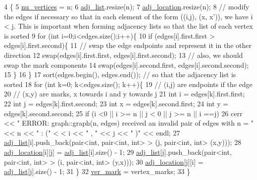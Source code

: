\begin{DoxyCode}
4 \{ 
5   \hyperlink{classmarked__graph_acf79c6aeb8f32614cb14a5baaa6c9f9b}{nu\_vertices} = n;
6   \hyperlink{classmarked__graph_a1a0bf7ca413a278763f7c878b3b6fd6f}{adj\_list}.resize(n);
7   \hyperlink{classmarked__graph_a3ae722ea9583ad23af34d789a88ac01a}{adj\_location}.resize(n);
8   \textcolor{comment}{// modify the edges if necessary so that in each element of the form ((i,j), (x, x')), we have i < j.
       This is important when forming adjacency lists so that the list of each vertex is sorted}
9   \textcolor{keywordflow}{for} (\textcolor{keywordtype}{int} i=0;i<edges.size();i++)\{
10     \textcolor{keywordflow}{if} (edges[i].first.first > edges[i].first.second)\{
11       \textcolor{comment}{// swap the edge endpoints and represent it in the other direction}
12       swap(edges[i].first.first, edges[i].first.second);
13       \textcolor{comment}{// also, we should swap the mark components}
14       swap(edges[i].second.first, edges[i].second.second);
15     \}
16   \}
17   sort(edges.begin(), edges.end()); \textcolor{comment}{// so that the adjacency list is sorted}
18   \textcolor{keywordflow}{for} (\textcolor{keywordtype}{int} k=0; k<edges.size(); k++)\{
19     \textcolor{comment}{// (i,j) are endpoints if the edge}
20     \textcolor{comment}{// (x,y) are marks, x towards i and y towards j}
21     \textcolor{keywordtype}{int} i = edges[k].first.first;
22     \textcolor{keywordtype}{int} j = edges[k].first.second;
23     \textcolor{keywordtype}{int} x = edges[k].second.first;
24     \textcolor{keywordtype}{int} y = edges[k].second.second;
25     \textcolor{keywordflow}{if} (i <0 || i >= n || j < 0 || j >= n || i ==j)
26       cerr << \textcolor{stringliteral}{" ERROR: graph::graph(n, edges) received an invalid pair of edges with n = "} << n << \textcolor{stringliteral}{" : ("} <
      < i << \textcolor{stringliteral}{" , "} << j << \textcolor{stringliteral}{" )"} << endl;
27     \hyperlink{classmarked__graph_a1a0bf7ca413a278763f7c878b3b6fd6f}{adj\_list}[i].push\_back(pair<\textcolor{keywordtype}{int}, pair<int, int> > (j, pair<int, int> (x,y)));
28     \hyperlink{classmarked__graph_a3ae722ea9583ad23af34d789a88ac01a}{adj\_location}[i][j] = \hyperlink{classmarked__graph_a1a0bf7ca413a278763f7c878b3b6fd6f}{adj\_list}[i].size() - 1;
29     \hyperlink{classmarked__graph_a1a0bf7ca413a278763f7c878b3b6fd6f}{adj\_list}[j].push\_back(pair<\textcolor{keywordtype}{int}, pair<int, int> > (i, pair<int, int> (y,x)));
30     \hyperlink{classmarked__graph_a3ae722ea9583ad23af34d789a88ac01a}{adj\_location}[j][i] = \hyperlink{classmarked__graph_a1a0bf7ca413a278763f7c878b3b6fd6f}{adj\_list}[j].size() - 1;
31   \}
32   \hyperlink{classmarked__graph_ac83e9377dd4d8bb95be1ac949b127296}{ver\_mark} = vertex\_marks;
33 \}
\end{DoxyCode}


